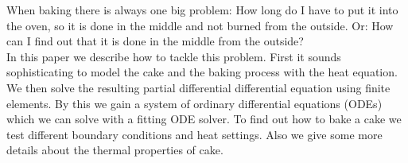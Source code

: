 
When baking there is always one big problem: How long do I have to put it into the oven, so it is done in the middle and not burned from the outside. Or: How can I find out that it is done in the middle from the outside? \\

In this paper we describe how to tackle this problem. First it sounds sophisticating to model the cake and the baking process with the heat equation. We then solve the resulting partial differential differential equation using finite elements. By this we gain a system of ordinary differential equations (ODEs) which we can solve with a fitting ODE solver. To find out how to bake a cake we test different boundary conditions and heat settings. Also we give some more details about the thermal properties of cake.
